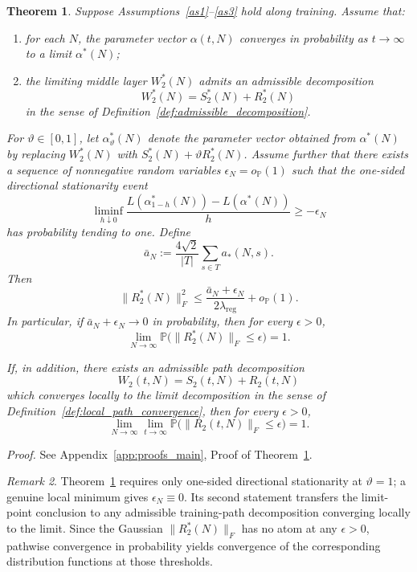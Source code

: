 \documentclass[11pt]{article}
\theoremstyle{plain}
\newtheorem{thm}{Theorem}[section]
\theoremstyle{definition}
\theoremstyle{remark}
\newtheorem{rem}[thm]{Remark}
\newcommand{\PP}{\mathbb{P}}
\newcommand{\1}{\mathbf{1}}
\newcommand{\proofloc}[1]{\par\noindent\emph{Proof.} #1\par}
\begin{document}
\begin{thm}
\label{main_result_reducing_noise}
Suppose Assumptions~\ref{as1}--\ref{as3} hold along training. Assume that:
\begin{enumerate}[leftmargin=2em]
\item for each \(N\), the parameter vector \(\alpha(t,N)\) converges in probability as \(t\to\infty\) to a limit \(\alpha^*(N)\);
\item the limiting middle layer \(W_2^*(N)\) admits an admissible decomposition
\[
W_2^*(N)=S_2^*(N)+R_2^*(N)
\]
in the sense of Definition~\ref{def:admissible_decomposition}.
\end{enumerate}
\noindent For \(\vartheta\in[0,1]\), let \(\alpha_\vartheta^*(N)\) denote the parameter vector obtained from \(\alpha^*(N)\) by replacing \(W_2^*(N)\) with \(S_2^*(N)+\vartheta R_2^*(N)\). Assume further that there exists a sequence of nonnegative random variables \(\epsilon_N=o_{\PP}(1)\) such that the one-sided directional stationarity event
\[
\liminf_{h\downarrow0}
\frac{
L(\alpha_{1-h}^*(N))-L(\alpha^*(N))
}{h}
\ge -\epsilon_N
\]
has probability tending to one.
Define
\[
\bar a_N:=\frac{4\sqrt{2}}{|T|}\sum_{s\in T}a_*(N,s).
\]
Then
\[
\|R_2^*(N)\|_F^2
\le
\frac{\bar a_N+\epsilon_N}{2\lambda_{\mathrm{reg}}}
+o_{\PP}(1).
\]
In particular, if \(\bar a_N+\epsilon_N\to0\) in probability, then for every \(\epsilon>0\),
\[
\lim_{N\to\infty}\PP\big(\|R_2^*(N)\|_F\le \epsilon\big)=1.
\]

If, in addition, there exists an admissible path decomposition
\[
W_2(t,N)=S_2(t,N)+R_2(t,N)
\]
which converges locally to the limit decomposition in the sense of Definition~\ref{def:local_path_convergence}, then for every \(\epsilon>0\),
\[
\lim_{N\to\infty}\lim_{t\to\infty}\PP\big(\|R_2(t,N)\|_F\le \epsilon\big)=1.
\]
\end{thm}
\proofloc{See Appendix~\ref{app:proofs_main}, Proof of Theorem~\ref{main_result_reducing_noise}.}

\begin{rem}
Theorem~\ref{main_result_reducing_noise} requires only one-sided directional stationarity at \(\vartheta=1\); a genuine local minimum gives \(\epsilon_N\equiv0\). Its second statement transfers the limit-point conclusion to any admissible training-path decomposition converging locally to the limit. Since the Gaussian \(\|R_2^*(N)\|_F\) has no atom at any \(\epsilon>0\), pathwise convergence in probability yields convergence of the corresponding distribution functions at those thresholds.
\end{rem}
\end{document}
